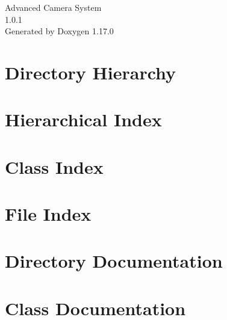 \documentclass[twoside]{book}
\newcommand{\+}{\discretionary{\mbox{\scriptsize$\hookleftarrow$}}{}{}}
\newcommand{\clearemptydoublepage}{%
    \newpage{\pagestyle{empty}\cleardoublepage}%
  }
\begin{document}
  \raggedbottom
    \hypersetup{pageanchor=false,
                bookmarksnumbered=true,
                pdfencoding=unicode
               }
  \begin{titlepage}
  \vspace*{7cm}
  \begin{center}%
  {\Large Advanced Camera System}\\
  [1ex]\large 1.\+0.\+1 \\
  \vspace*{1cm}
  {\large Generated by Doxygen 1.17.0}\\
  \end{center}
  \end{titlepage}
  \clearemptydoublepage
  \tableofcontents
  \clearemptydoublepage
  \hypersetup{pageanchor=true}
\chapter{Directory Hierarchy}

\chapter{Hierarchical Index}

\chapter{Class Index}

\chapter{File Index}

\chapter{Directory Documentation}





\chapter{Class Documentation}















\end{document}

